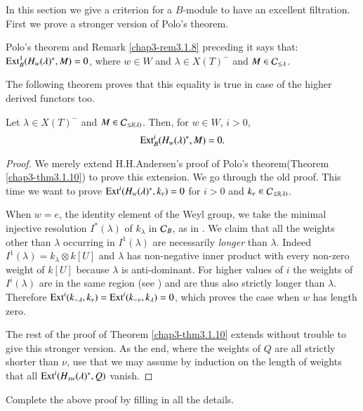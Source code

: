 In\label{page28} this section we give a criterion for a $B$-module to have an
excellent filtration. First we prove a stronger version of Polo's
theorem.

\begin{remark}\label{chap3-rem3.2.1}
Polo's theorem and Remark \ref{chap3-rem3.1.8} preceding it says that:
$\operatorname{Ext}^{1}_{B}(H_{w}(\lambda)^{*},M)=0$, where $w\in W$ and $\lambda\in
X(T)^{-}$ and $M\in \mathcal{C}_{\leq \lambda}$.
\end{remark}

The following theorem proves that this equality is true in case of the
higher derived functors too.

\begin{theorem}\label{chap3-thm3.2.2}
Let $\lambda\in X(T)^{-}$ and $M\in \mathcal{C}_{\leq l(\lambda)}$. Then, for
$w\in W$, $i>0$,
$$
\operatorname{Ext}^{i}_{B}(H_{w}(\lambda)^{*},M)=0.
$$
\end{theorem}

\begin{proof}
We merely extend H.H.\@ Andersen's proof of Polo's theorem\break (Theorem
\ref{chap3-thm3.1.10}) to prove this extension. We go through the old
proof. This time we want to prove
$\operatorname{Ext}^{i}(H_{w}(\lambda)^{*},k_{\nu})=0$ for $i>0$ and $k_{\nu}\in
\mathcal{C}_{\leq l(\lambda)}$.

When $w=e$, the identity element of the Weyl group, we take the
minimal injective resolution $I^{*}(\lambda)$ of $k_{\lambda}$ in
$\mathcal{C}_{B}$, as in \cite[II 4.8-9]{key11}. We claim that all the weights
other than $\lambda$ occurring in $I^{1}(\lambda)$ are necessarily
{\em longer} than $\lambda$. Indeed $I^{1}(\lambda)=k_{\lambda}\otimes
k[U]$ and $\lambda$ has non-negative inner product with every non-zero
weight of $k[U]$ because $\lambda$ is anti-dominant. For higher values
of $i$ the weights of $I^{i}(\lambda)$ are in the same region (see
\cite[II 4.8-9]{key11}) and are thus also strictly longer than
$\lambda$. Therefore
$\operatorname{Ext}^{i}(k_{-\lambda},k_{\nu})=\operatorname{Ext}^{i}(k_{-\nu},k_{\lambda})=0$,
which proves the case when $w$ has length zero.

The rest of the proof of Theorem \ref{chap3-thm3.1.10} extends without
trouble to give this stronger version. As the end, where the weights
of $Q$ are all strictly shorter than $\nu$, use that we may assume by
induction on the length of weights that all
$\operatorname{Ext}^{i}(H_{sw}(\lambda)^{*},Q)$ vanish.
\end{proof}

\begin{exercise}\label{chap3-exer3.2.3}
Complete the above proof by filling in all the details.
\end{exercise}

